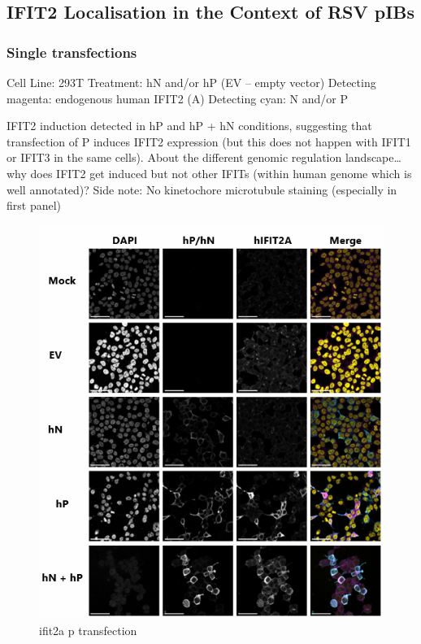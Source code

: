 \subsection{IFIT2 Localisation in the Context of RSV pIBs} \label{subsec:IFIT2 Localisation in the Context of RSV pIBs}
\subsubsection{Single transfections}
Cell Line: 293T \newline
Treatment: hN and/or hP (EV – empty vector) \newline
Detecting magenta: endogenous human IFIT2 (A) \newline
Detecting cyan: N and/or P \newline

IFIT2 induction detected in hP and hP + hN conditions, suggesting that transfection of P induces IFIT2 expression (but this does not happen with IFIT1 or IFIT3 in the same cells).
About the different genomic regulation landscape… why does IFIT2 get induced but not other IFITs (within human genome which is well annotated)? 
Side note: No kinetochore microtubule staining (especially in first panel)

\begin{figure}
    \centering
    \includegraphics[width=1\linewidth]{10. Chapter 5/Figs/02. pIB/01. ifit2a p transfection.png}
    \caption[ifit2a p transfection]{ifit2a p transfection}
    \label{fig:ifit2a p transfection}
\end{figure}

